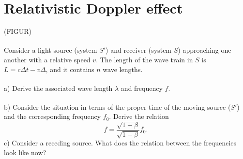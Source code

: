 \documentclass{article}
\begin{document}
    \section{Relativistic Doppler effect}
        (FIGUR) \\ \\
        Consider a light source (system $S'$) and receiver (system $S$) approaching one another with a relative speed $v$. The length of the wave train in $S$ is $L = c \Delta t - v \Delta$, and it contains $n$ wave lengths. \\ \\
        a) Derive the associated wave length $\lambda$ and frequency $f$. \\ \\
        b) Consider the situation in terms of the proper time of the moving source ($S'$) and the corresponding frequency $f_0$. Derive the relation 
        \begin{equation*}
            f = \frac{\sqrt{1 + \beta}}{\sqrt{1 - \beta}}f_0.
        \end{equation*}
        c) Consider a receding source. What does the relation between the frequencies look like now? 
\end{document}

